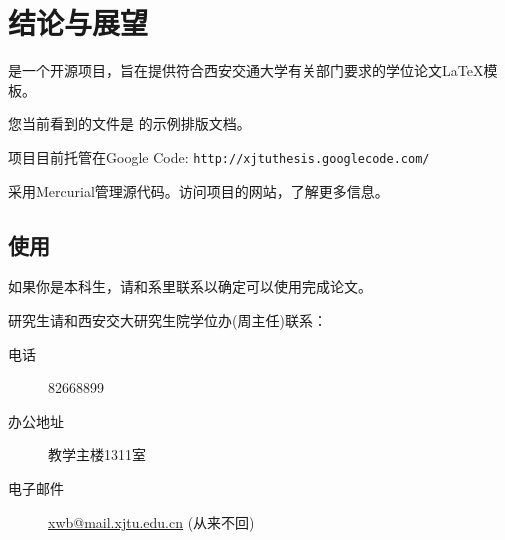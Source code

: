 % 
%
%
% 
%
\chapter{结论与展望}

    \xjtuthesis 是一个开源项目，旨在提供符合西安交通大学有关部门要求的学位论文\LaTeX 模板。

    您当前看到的文件是 \xjtuthesis{} \metaversion 的示例排版文档。

    \xjtuthesis 项目目前托管在Google Code: \verb|http://xjtuthesis.googlecode.com/|
    
    \xjtuthesis 采用Mercurial管理源代码。访问项目的网站，了解更多信息。

    \section{使用\xjtuthesis}

        如果你是本科生，请和系里联系以确定可以使用\xjtuthesis 完成论文。

        研究生请和西安交大研究生院学位办(周主任)联系：
        
        \begin{description}
            \item[电话] 82668899
            \item[办公地址] 教学主楼1311室
            \item[电子邮件] \url{xwb@mail.xjtu.edu.cn} (从来不回)
        \end{description}
